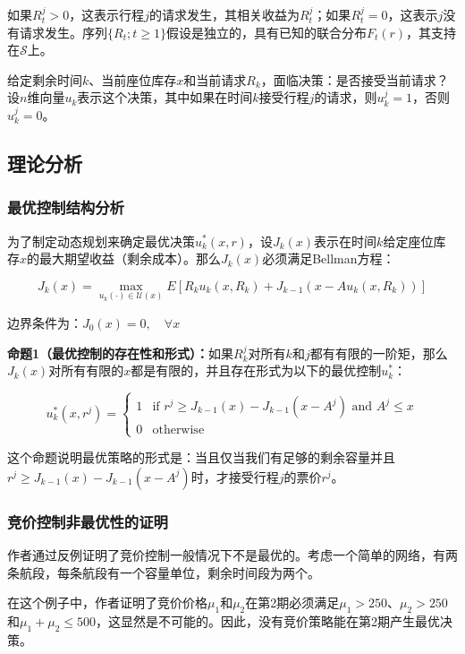 \documentclass[
  10pt
]{article}
\begin{document}
如果$R_t^j > 0$，这表示行程$j$的请求发生，其相关收益为$R_t^j$；如果$R_t^j = 0$，这表示$j$没有请求发生。序列$\{R_t; t \geq 1\}$假设是独立的，具有已知的联合分布$F_t(r)$，其支持在$\mathcal{S}$上。

给定剩余时间$k$、当前座位库存$x$和当前请求$R_k$，面临决策：是否接受当前请求？设$n$维向量$u_k$表示这个决策，其中如果在时间$k$接受行程$j$的请求，则$u_k^j = 1$，否则$u_k^j = 0$。

\subsection{理论分析}

\subsubsection{最优控制结构分析}

为了制定动态规划来确定最优决策$u_k^*(x,r)$，设$J_k(x)$表示在时间$k$给定座位库存$x$的最大期望收益（剩余成本）。那么$J_k(x)$必须满足Bellman方程：

$$J_k(x) = \max_{u_k(\cdot) \in \mathcal{U}(x)} E[R_k u_k(x,R_k) + J_{k-1}(x - A u_k(x,R_k))]$$

边界条件为：$J_0(x) = 0, \quad \forall x$

\begin{propositionbox}
\textbf{命题1（最优控制的存在性和形式）：}如果$R_k^j$对所有$k$和$j$都有有限的一阶矩，那么$J_k(x)$对所有有限的$x$都是有限的，并且存在形式为以下的最优控制$u_k^*$：

$$u_k^*(x,r^j) = \begin{cases}
1 & \text{if } r^j \geq J_{k-1}(x) - J_{k-1}(x - A^j) \text{ and } A^j \leq x \\
0 & \text{otherwise}
\end{cases}$$
\end{propositionbox}

这个命题说明最优策略的形式是：当且仅当我们有足够的剩余容量并且$r^j \geq J_{k-1}(x) - J_{k-1}(x - A^j)$时，才接受行程$j$的票价$r^j$。

\subsubsection{竞价控制非最优性的证明}

作者通过反例证明了竞价控制一般情况下不是最优的。考虑一个简单的网络，有两条航段，每条航段有一个容量单位，剩余时间段为两个。

在这个例子中，作者证明了竞价价格$\mu_1$和$\mu_2$在第2期必须满足$\mu_1 > 250$、$\mu_2 > 250$和$\mu_1 + \mu_2 \leq 500$，这显然是不可能的。因此，没有竞价策略能在第2期产生最优决策。
\end{document}
